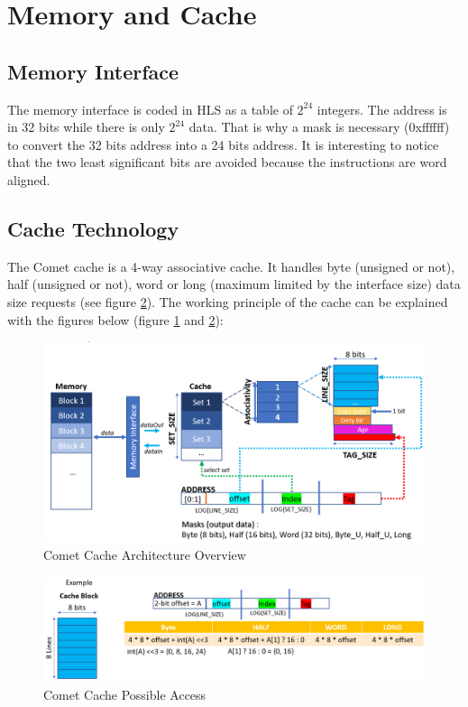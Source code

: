 \documentclass[10pt,letterpaper]{article}
\begin{document}
\section{Memory and Cache}

\subsection{Memory Interface}

The memory interface is coded in HLS as a table of $2^{24}$ integers. The address is in 32 bits while there is only $2^{24}$ data. That is why a mask is necessary (0xffffff) to convert the 32 bits address into a 24 bits address. It is interesting to notice that the two least significant bits are avoided because the instructions are word aligned. 

\subsection{Cache Technology}

The Comet cache is a 4-way associative cache. It handles byte (unsigned or not), half (unsigned or not), word or long (maximum limited by the interface size) data size requests (see figure \ref{fig:cache_mask}). The working principle of the cache can be explained with the figures below (figure \ref{fig:cache} and \ref{fig:cache_mask}):

\begin{figure}[H]
\centering
\includegraphics[width=14cm]{img/cache_macro.PNG}
\caption{Comet Cache Architecture Overview}
\label{fig:cache}
\end{figure}

\begin{figure}[H]
\centering
\includegraphics[width=14cm]{img/cache_mask.PNG}
\caption{Comet Cache Possible Access}
\label{fig:cache_mask}
\end{figure}
\end{document}
